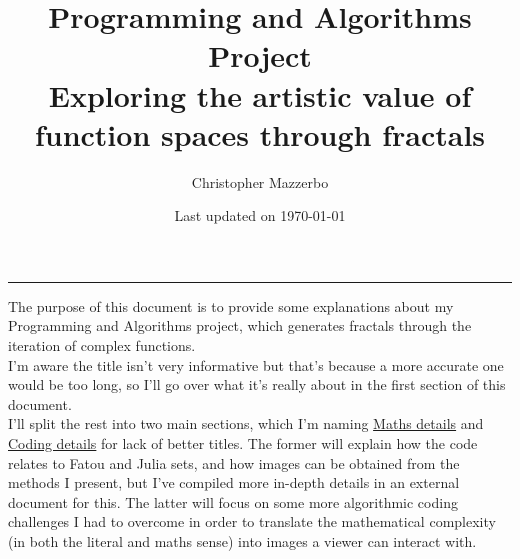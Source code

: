 \documentclass{article}
\title{Programming and Algorithms Project \\ Exploring the artistic value of function spaces through fractals}
\author{Christopher Mazzerbo}
\date{Last updated on \today}
\begin{document}


\titlespacing{\subsubsection}{5mm}{0cm}{0cm}


\pagestyle{plain}
\maketitle
\vspace{5mm}
\hrule
\pagebreak


\pagestyle{fancy}
\fancyhf{}
\fancyhfoffset[L]{1cm} %
\fancyhfoffset[R]{1cm} %
\fancyfoot{}
\fancyfoot[C]{\thepage}

\tableofcontents
\pagebreak


The purpose of this document is to provide some explanations about my Programming and Algorithms project, which generates fractals through the iteration of complex functions. \\
\vspace{5mm}
I'm aware the title isn't very informative but that's because a more accurate one would be too long, so I'll go over what it's really about in the first section of this document. \\
\vspace{2mm}
I'll split the rest into two main sections, which I'm naming \underline{Maths details} and \underline{Coding details} for lack of better titles. The former will explain how the code relates to Fatou and Julia sets, and how images can be obtained from the methods I present, but I've compiled more in-depth details in an external document for this. The latter will focus on some more algorithmic coding challenges I had to overcome in order to translate the mathematical complexity (in both the literal and maths sense) into images a viewer can interact with.
\end{document}
